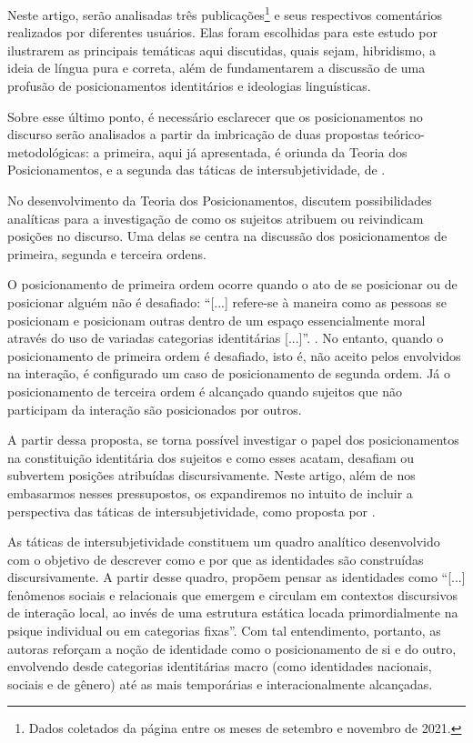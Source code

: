 \documentclass[portuguese]{textolivre}
\begin{document}
Neste artigo, serão analisadas três publicações\footnote{Dados coletados da página entre os meses de setembro e novembro de 2021.} e seus respectivos comentários realizados por diferentes usuários. Elas foram escolhidas para este estudo por ilustrarem as principais temáticas aqui discutidas, quais sejam, hibridismo, a ideia de língua pura e correta, além de fundamentarem a discussão de uma profusão de posicionamentos identitários e ideologias linguísticas.

Sobre esse último ponto, é necessário esclarecer que os posicionamentos no discurso serão analisados a partir da imbricação de duas propostas teórico-metodológicas: a primeira, aqui já apresentada, é oriunda da Teoria dos Posicionamentos, e a segunda das táticas de intersubjetividade, de \textcite{bucholtz_language_2004,bucholtz_identity_2005}.

No desenvolvimento da Teoria dos Posicionamentos, \textcite{harre_positioning_1999} discutem possibilidades analíticas para a investigação de como os sujeitos atribuem ou reivindicam posições no discurso. Uma delas se centra na discussão dos posicionamentos de primeira, segunda e terceira ordens.

O posicionamento de primeira ordem ocorre quando o ato de se posicionar ou de posicionar alguém não é desafiado: “[...] refere-se à maneira como as pessoas se posicionam e posicionam outras dentro de um espaço essencialmente moral através do uso de variadas categorias identitárias [...]”. \cite[p. 20]{harre_positioning_1999}. No entanto, quando o posicionamento de primeira ordem é desafiado, isto é, não aceito pelos envolvidos na interação, é configurado um caso de posicionamento de segunda ordem. Já o posicionamento de terceira ordem é alcançado quando sujeitos que não participam da interação são posicionados por outros.

A partir dessa proposta, se torna possível investigar o papel dos posicionamentos na constituição identitária dos sujeitos e como esses acatam, desafiam ou subvertem posições atribuídas discursivamente. Neste artigo, além de nos embasarmos nesses pressupostos, os expandiremos no intuito de incluir a perspectiva das táticas de intersubjetividade, como proposta por \textcite{bucholtz_language_2004,bucholtz_identity_2005}.

As táticas de intersubjetividade constituem um quadro analítico desenvolvido com o objetivo de descrever como e por que as identidades são construídas discursivamente. A partir desse quadro, \textcite[p. 586]{bucholtz_identity_2005} propõem pensar as identidades como “[...] fenômenos sociais e relacionais que emergem e circulam em contextos discursivos de interação local, ao invés de uma estrutura estática locada primordialmente na psique individual ou em categorias fixas”. Com tal entendimento, portanto, as autoras reforçam a noção de identidade como o posicionamento de si e do outro, envolvendo desde categorias identitárias macro (como identidades nacionais, sociais e de gênero) até as mais temporárias e interacionalmente alcançadas.
\end{document}
